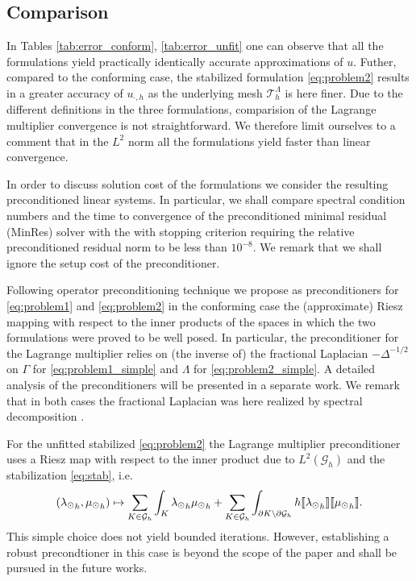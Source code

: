 \subsection{Comparison}
In Tables \ref{tab:error_conform}, \ref{tab:error_unfit} one can observe that 
all the formulations yield practically identically accurate approximations of $u$.
Futher, compared to the conforming case, the stabilized formulation \eqref{eq:problem2}
results in a greater accuracy of $u_{\cdot, h}$ as the underlying mesh $\mathcal{T}^{\Lambda}_{h}$ is
here finer. Due to the different definitions in the three formulations, comparision of the Lagrange
multiplier convergence is not straightforward. We therefore limit ourselves to a
comment that in the $L^2$ norm all the formulations yield faster than linear convergence.

In order to discuss solution cost of the formulations we consider 
the resulting preconditioned linear systems. In particular, we shall compare
spectral condition numbers and the time to convergence of the preconditioned
minimal residual (MinRes) solver with the with stopping criterion requiring
the relative preconditioned residual norm to be less than $10^{-8}$. We remark
that we shall ignore the setup cost of the preconditioner.

Following operator preconditioning technique \cite{mardal2011preconditioning} we
propose as preconditioners for \eqref{eq:problem1} and \eqref{eq:problem2} in the
conforming case the (approximate) Riesz mapping with respect to the inner products of
the spaces in which the two formulations were proved to be well posed.
In particular, the preconditioner for the Lagrange multiplier relies on
(the inverse of) the fractional Laplacian $-\Delta^{-1/2}$ on $\Gamma$ for
\eqref{eq:problem1_simple} and $\Lambda$ for \eqref{eq:problem2_simple}.
A detailed analysis of the preconditioners will be presented in a separate
work. We remark that in both cases the fractional Laplacian was here realized
by spectral decomposition \cite{kuchta2016preconditioners}.

For the unfitted stabilized \eqref{eq:problem2} the Lagrange multiplier preconditioner
uses a Riesz map with respect to the inner product due to $L^2(\mathcal{G}_h)$ and
the stabilization \eqref{eq:stab}, i.e.
\[
({\lambda_{\odot}}_h, {\mu_{\odot}}_h) \mapsto \sum _{K\in \mathcal{G}_h}\int_{K}{\lambda_{\odot}}_h {\mu_{\odot}}_h + \sum _{K\in \mathcal{G}_h} \int_{\partial K \setminus \partial \mathcal{G}_h} h \llbracket {\lambda_{\odot}}_h \rrbracket \llbracket {\mu_{\odot}}_h \rrbracket.
\]
This simple choice does not yield bounded
iterations. However, establishing a robust precondtioner in this case 
is beyond the scope of the paper and shall be pursued in the future works.


